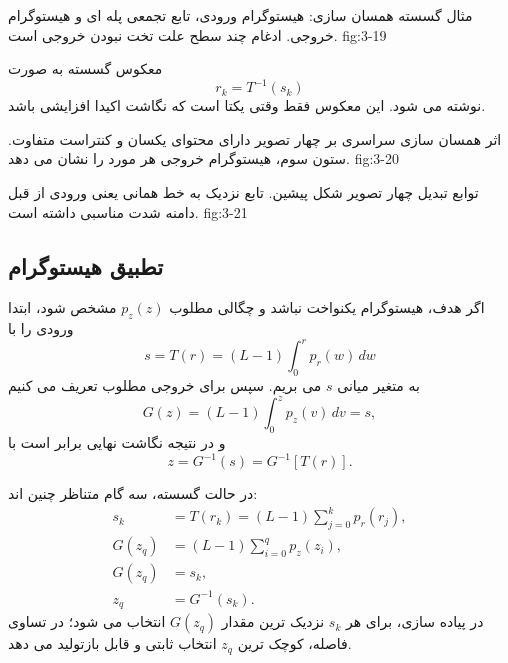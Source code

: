 {مثال گسسته همسان سازی: هیستوگرام ورودی، تابع تجمعی پله ای و هیستوگرام
خروجی. ادغام چند سطح علت تخت نبودن خروجی است.}
{fig:3-19}

معکوس گسسته به صورت
\begin{equation}
  r_k=T^{-1}(s_k)
  \tag{3-16}\label{eq:3-16}
\end{equation}
نوشته می شود. این معکوس فقط وقتی یکتا است که نگاشت اکیدا افزایشی باشد.

{اثر همسان سازی سراسری بر چهار تصویر دارای محتوای یکسان و کنتراست متفاوت.
ستون سوم، هیستوگرام خروجی هر مورد را نشان می دهد.}
{fig:3-20}

{توابع تبدیل چهار تصویر شکل پیشین. تابع نزدیک به خط همانی یعنی ورودی از قبل
دامنه شدت مناسبی داشته است.}
{fig:3-21}

\subsection{تطبیق هیستوگرام}

اگر هدف، هیستوگرام یکنواخت نباشد و چگالی مطلوب \(p_z(z)\) مشخص شود، ابتدا
ورودی را با
\begin{equation}
  s=T(r)=(L-1)\int_0^r p_r(w)\,dw
  \tag{3-17}\label{eq:3-17}
\end{equation}
به متغیر میانی \(s\) می بریم. سپس برای خروجی مطلوب تعریف می کنیم
\begin{equation}
  G(z)=(L-1)\int_0^z p_z(v)\,dv=s,
  \tag{3-18}\label{eq:3-18}
\end{equation}
و در نتیجه نگاشت نهایی برابر است با
\begin{equation}
  z=G^{-1}(s)=G^{-1}[T(r)].
  \tag{3-19}\label{eq:3-19}
\end{equation}

در حالت گسسته، سه گام متناظر چنین اند:
\begin{align}
  s_k&=T(r_k)=(L-1)\sum_{j=0}^{k}p_r(r_j),
  \tag{3-20}\label{eq:3-20}\\
  G(z_q)&=(L-1)\sum_{i=0}^{q}p_z(z_i),
  \tag{3-21}\label{eq:3-21}\\
  G(z_q)&=s_k,
  \tag{3-22}\label{eq:3-22}\\
  z_q&=G^{-1}(s_k).
  \tag{3-23}\label{eq:3-23}
\end{align}
در پیاده سازی، برای هر \(s_k\) نزدیک ترین مقدار \(G(z_q)\) انتخاب می شود؛
در تساوی فاصله، کوچک ترین \(z_q\) انتخاب ثابتی و قابل بازتولید می دهد.

